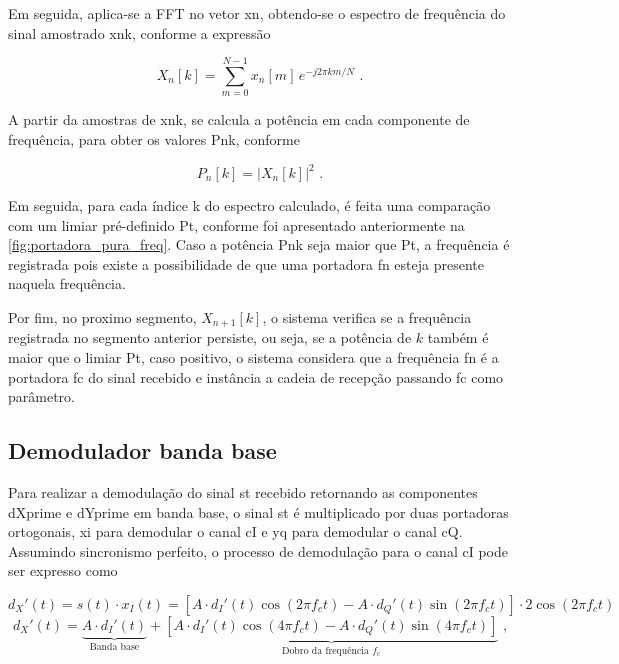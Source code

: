 Em seguida, aplica-se a \gls{FFT} no vetor \gls{xn}, obtendo-se o espectro de frequência do sinal amostrado \gls{xnk}, conforme a expressão 

\vspace{-0.4em}
\begin{equation}
    X_n[k] = \sum_{m=0}^{N-1} x_n[m]\, e^{-j2\pi km/N} \text{ .}
\end{equation}

A partir da amostras de \gls{xnk}, se calcula a potência em cada componente de frequência, para obter os valores \gls{Pnk}, conforme

\vspace{-0.4em}
\begin{equation}
    P_n[k] = |X_n[k]|^2 \text{ .}
\end{equation}

Em seguida, para cada índice \gls{k} do espectro calculado, é feita uma comparação com um limiar pré-definido \gls{Pt}, conforme foi apresentado anteriormente na \autoref{fig:portadora_pura_freq}. Caso a potência \gls{Pnk} seja maior que \gls{Pt}, a frequência é registrada pois existe a possibilidade de que uma portadora \gls{fn} esteja presente naquela frequência. 

Por fim, no proximo segmento, $X_{n+1}[k]$, o sistema verifica se a frequência registrada no segmento anterior persiste, ou seja, se a potência de $k$ também é maior que o limiar \gls{Pt}, caso positivo, o sistema considera que a frequência \gls{fn} é a portadora \gls{fc} do sinal recebido e instância a cadeia de recepção passando \gls{fc} como parâmetro.



\subsection{Demodulador banda base}

Para realizar a demodulação do sinal \gls{st} recebido retornando as componentes \gls{dXprime} e \gls{dYprime} em banda base, o sinal \gls{st} é multiplicado por duas portadoras ortogonais, \gls{xi} para demodular o canal \gls{cI} e \gls{yq} para demodular o canal \gls{cQ}. Assumindo sincronismo perfeito, o processo de demodulação para o canal \gls{cI} pode ser expresso como

\vspace{-1.2em}
\begin{equation}
d_X'(t) = s(t) \cdot x_I(t) = \left[A \cdot d_I'(t) \cos(2\pi f_c t ) - A \cdot d_Q'(t) \sin(2\pi f_c t )\right] \cdot 2\cos(2\pi f_c t )
\end{equation}
\vspace{-0.8em}
\begin{equation}
    d_X'(t) =
    \underbrace{A \cdot d_I'(t)}_{\text{Banda base}} + 
    \underbrace{\left[
        A \cdot d_I'(t) \cos(4\pi f_c t ) 
        - A \cdot d_Q'(t) \sin(4\pi f_c t )
    \right]}_{\text{Dobro da frequência $f_c$}} \text{ ,}
\end{equation}

